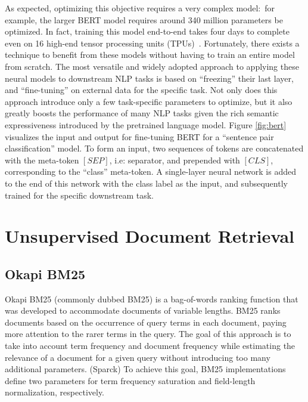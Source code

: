 As expected, optimizing this objective requires a very complex model:\ for example, the larger BERT model requires around 340 million parameters be optimized.
In fact, training this model end-to-end takes four days to complete even on 16 high-end tensor processing units (TPUs)~\cite{devlin2018bert}.
Fortunately, there exists a technique to benefit from these models without having to train an entire model from scratch.
The most versatile and widely adopted approach to applying these neural models to downstream NLP tasks is based on ``freezing'' their last layer, and ``fine-tuning'' on external data for the specific task.
Not only does this approach introduce only a few task-specific parameters to optimize, but it also greatly boosts the performance of many NLP tasks given the rich semantic expressiveness introduced by the pretrained language model.
Figure \ref{fig:bert} visualizes the input and output for fine-tuning BERT for a ``sentence pair classification'' model.
To form an input, two sequences of tokens are concatenated with the meta-token $[SEP]$, i.e: separator, and prepended with $[CLS]$, corresponding to the ``class'' meta-token.
A single-layer neural network is added to the end of this network with the class label as the input, and subsequently trained for the specific downstream task.


\section{Unsupervised Document Retrieval}

\subsection{Okapi BM25}


Okapi BM25 (commonly dubbed BM25) is a bag-of-words ranking function that was developed to accommodate documents of variable lengths.
BM25 ranks documents based on the occurrence of query terms in each document, paying more attention to the rarer terms in the query.
The goal of this approach is to take into account term frequency and document frequency while estimating the relevance of a document for a given query without introducing too many additional parameters. (Sparck)
To achieve this goal, BM25 implementations define two parameters for term frequency saturation and field-length normalization, respectively.

